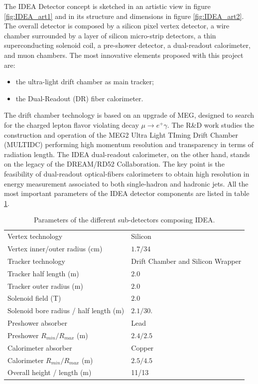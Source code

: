 The IDEA Detector concept is sketched in an artistic view in figure \ref{fig:IDEA_art1} and in its structure and dimensions in figure \ref{fig:IDEA_art2}. 
The overall detector is composed by a silicon pixel vertex detector, a wire chamber surrounded by a layer of silicon micro-strip detectors, a thin superconducting solenoid coil, a pre-shower detector, a dual-readout calorimeter, and muon chambers.
The most innovative elements proposed with this project are:
\begin{itemize}
    \item the ultra-light drift chamber as main tracker;
    \item the Dual-Readout (DR) fiber calorimeter.
\end{itemize}

The drift chamber technology is based on an upgrade of MEG, designed to search for the charged lepton flavor violating decay $\mu \rightarrow e^+\gamma$. The R\&D work studies the construction and operation of the MEG2 Ultra Light TIming Drift Chamber (MULTIDC) performing high momentum resolution and transparency in terms of radiation length.
The IDEA dual-readout calorimeter, on the other hand, stands on the legacy of the DREAM/RD52 Collaboration. The key point is the feasibility of dual-readout optical-fibers calorimeters to obtain high resolution in energy measurement associated to both single-hadron and hadronic jets.
All the most important parameters of the IDEA detector components are listed in table \ref{tab:IDEA_part}.\\
\begin{table}[]
    \centering
    \begin{tabular}{ll}
        \toprule
        Vertex technology                       & Silicon \\
        Vertex inner/outer radius (cm)          & $1.7/34$ \\
        \midrule
        Tracker technology                      & Drift Chamber and Silicon Wrapper\\
        Tracker half length (m)                 & $2.0$ \\
        Tracker outer radius (m)                & $2.0$ \\
        \midrule
        Solenoid field (T)                      & $2.0$ \\
        Solenoid bore radius / half length (m)  & $2.1/30.$ \\
        \midrule
        Preshower absorber                      & Lead \\
        Preshower $R_{min}/R_{max}$ (m)         & $2.4/2.5$ \\
        \midrule
        Calorimeter absorber                    & Copper \\
        Calorimeter $R_{min}/R_{max}$ (m)       & $2.5/4.5$ \\
        \midrule
        Overall height / length (m)             & 11/13 \\
        \bottomrule
    \end{tabular}
    \caption{Parameters of the different sub-detectors composing IDEA.}
    \label{tab:IDEA_part}
\end{table}

